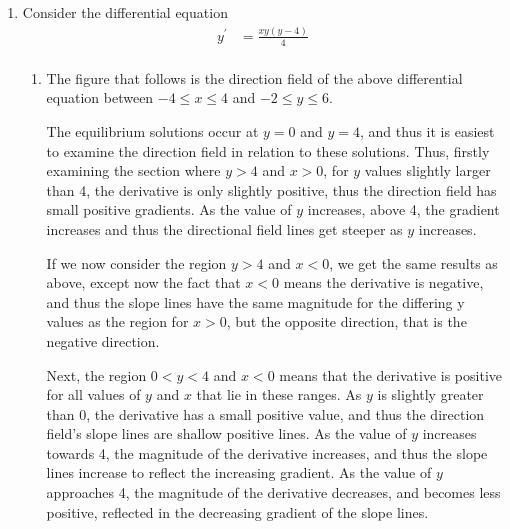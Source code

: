 \documentclass[a4paper]{article}
\begin{document}
\begin{enumerate}[label=\textbf{\arabic*.}]
\begin{enumerate}
	\end{enumerate}

	\pagebreak

	\item Consider the differential equation
	\begin{align*}
	y^{\prime} & = \frac{xy(y-4)}{4}\\
	\end{align*}

	\begin{enumerate}
		\item The figure that follows is the direction field of the above differential equation between $\displaystyle{-4 \leq x \leq 4}$ and $\displaystyle{-2 \leq y \leq 6}$.

		\bigbreak


		The equilibrium solutions occur at $\displaystyle{y=0}$ and $\displaystyle{y=4}$, and thus it is easiest to examine the direction field in relation to these solutions. Thus, firstly examining the section where $\displaystyle{y > 4}$ and $\displaystyle{x > 0}$, for $\displaystyle{y}$ values slightly larger than 4, the derivative is only slightly positive, thus the direction field has small positive gradients. As the value of $\displaystyle{y}$ increases, above 4, the gradient increases and thus the directional field lines get steeper as $\displaystyle{y}$ increases.

		\bigbreak

		If we now consider the region $\displaystyle{y> 4}$ and $\displaystyle{x<0}$, we get the same results as above, except now the fact that $\displaystyle{x<0}$ means the derivative is negative, and thus the slope lines have the same magnitude for the differing y values as the region for $\displaystyle{x>0}$, but the opposite direction, that is the negative direction.

		\bigbreak

		Next, the region $\displaystyle{0<y<4}$ and $\displaystyle{x<0}$ means that the derivative is positive for all values of $\displaystyle{y}$ and $\displaystyle{x}$ that lie in these ranges. As $\displaystyle{y}$ is slightly greater than 0, the derivative has a small positive value, and thus the direction field's slope lines are shallow positive lines. As the value of $\displaystyle{y}$ increases towards 4, the magnitude of the derivative increases, and thus the slope lines increase to reflect the increasing gradient. As the value of $\displaystyle{y}$ approaches 4, the magnitude of the derivative decreases, and becomes less positive, reflected in the decreasing gradient of the slope lines.


\end{enumerate}
\end{enumerate}
\end{document}
